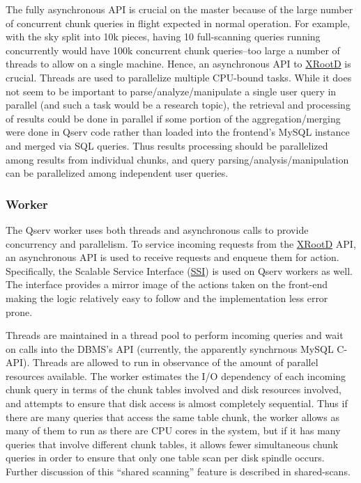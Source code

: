 \documentclass[DM,lsstdraft,toc]{lsstdoc}
\begin{document}
The fully asynchronous API is crucial on the master because of the large
number of concurrent chunk queries in flight expected in normal
operation. For example, with the sky split into 10k pieces, having 10
full-scanning queries running concurrently would have 100k concurrent
chunk queries--too large a number of threads to allow on a single
machine. Hence, an asynchronous API to \href{http://xrootd.org}{XRootD}
is crucial. Threads are used to parallelize multiple CPU-bound tasks.
While it does not seem to be important to parse/analyze/manipulate a
single user query in parallel (and such a task would be a research
topic), the retrieval and processing of results could be done in
parallel if some portion of the aggregation/merging were done in Qserv
code rather than loaded into the frontend's MySQL instance and merged
via SQL queries. Thus results processing should be parallelized among
results from individual chunks, and query parsing/analysis/manipulation
can be parallelized among independent user queries.

\subsubsection{Worker}\label{worker}

The Qserv worker uses both threads and asynchronous calls to provide
concurrency and parallelism. To service incoming requests from the
\href{http://xrootd.org}{XRootD} API, an asynchronous API is used to
receive requests and enqueue them for action. Specifically, the Scalable
Service Interface (\href{}{SSI}) is used on Qserv workers as well. The
interface provides a mirror image of the actions taken on the front-end
making the logic relatively easy to follow and the implementation less
error prone.

Threads are maintained in a thread pool to perform incoming queries and
wait on calls into the DBMS's API (currently, the apparently synchrnous
MySQL C-API). Threads are allowed to run in observance of the amount of
parallel resources available. The worker estimates the I/O dependency of
each incoming chunk query in terms of the chunk tables involved and disk
resources involved, and attempts to ensure that disk access is almost
completely sequential. Thus if there are many queries that access the
same table chunk, the worker allows as many of them to run as there are
CPU cores in the system, but if it has many queries that involve
different chunk tables, it allows fewer simultaneous chunk queries in
order to ensure that only one table scan per disk spindle occurs.
Further discussion of this ``shared scanning'' feature is described in
shared-scans.
\end{document}
